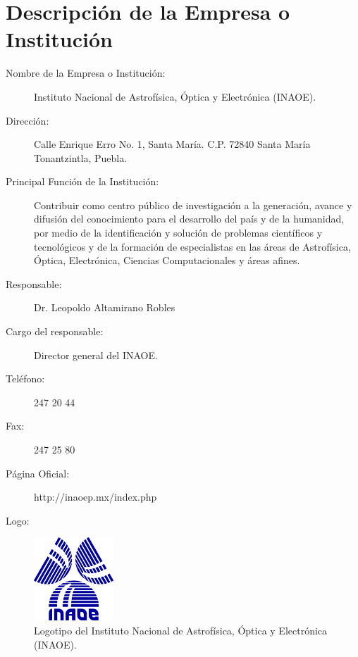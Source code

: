 \section{Descripción de la Empresa o Institución}

\begin{description}
	\item [Nombre de la Empresa o Institución:] Instituto Nacional de Astrofísica, Óptica y Electrónica (INAOE).
	\item [Dirección:] Calle Enrique Erro No. 1, Santa María. C.P. 72840 Santa María Tonantzintla, Puebla.
	\item [Principal Función de la Institución:] Contribuir como centro público de investigación a la generación, avance y difusión del conocimiento para el desarrollo del país y de la humanidad, por medio de la identificación y solución de problemas científicos y tecnológicos y de la formación de especialistas en las áreas de Astrofísica, Óptica, Electrónica, Ciencias Computacionales y áreas afines.
    \item [Responsable:] Dr. Leopoldo Altamirano Robles 
    \item [Cargo del responsable:] Director general del INAOE.
    \item [Teléfono:] 247 20 44
    \item [Fax:] 247 25 80
    \item [Página Oficial:] http://inaoep.mx/index.php
    \item [Logo:] 
\end{description}

\begin{figure}[!h]
	\centering
	\includegraphics[width=3cm]{img/inaoe.png}
    \caption{Logotipo del Instituto Nacional de Astrofísica, Óptica y Electrónica (INAOE).}
\end{figure}


